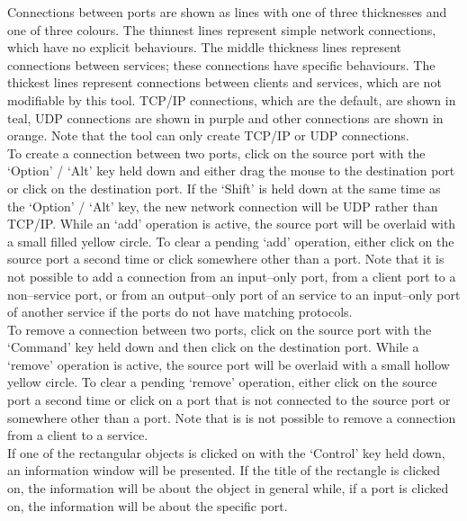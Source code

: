 Connections between ports are shown as lines with one of three thicknesses and one of
three colours.
The thinnest lines represent simple \yarp{} network connections, which have no explicit
behaviours.
The middle thickness lines represent connections between  services; these
connections have specific behaviours.
The thickest lines represent connections between clients and services, which are not
modifiable by this tool.
TCP/IP connections, which are the default, are shown in teal, UDP connections are shown in
purple and other connections are shown in orange.
Note that the tool can only create TCP/IP or UDP connections.\\

To create a connection between two ports, click on the source port with the `Option' /
`Alt' key held down and either drag the mouse to the destination port or click on the
destination port.
If the `Shift' is held down at the same time as the `Option' / `Alt' key, the new
network connection will be UDP rather than TCP/IP.
While an `add' operation is active, the source port will be overlaid with a small filled
yellow circle.
To clear a pending `add' operation, either click on the source port a second time or click
somewhere other than a port.
Note that it is not possible to add a connection from an input--only port, from a client
port to a non--service port, or from an output--only port of an  service to
an input--only port of another  service if the ports do not have matching
protocols.\\

To remove a connection between two ports, click on the source port with the `Command' key
held down and then click on the destination port.
While a `remove' operation is active, the source port will be overlaid with a small
hollow yellow circle.
To clear a pending `remove' operation, either click on the source port a second time or
click on a port that is not connected to the source port or somewhere other than a port.
Note that is is not possible to remove a connection from a client to a service.\\

If one of the rectangular objects is clicked on with the `Control' key held down, an
information window will be presented.
If the title of the rectangle is clicked on, the information will be about the
object in general while, if a port is clicked on, the information will be about the
specific port.\\

